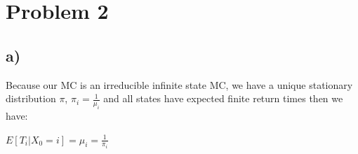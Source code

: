 \documentclass[]{article}
\begin{document}
\newpage

\hypertarget{problem-2}{%
\section{Problem 2}\label{problem-2}}

\hypertarget{a-1}{%
\subsection{a)}\label{a-1}}

Because our MC is an irreducible infinite state MC, we have a unique
stationary distribution \(\pi\), \(\pi_{i} = \frac{1}{\mu_{i}}\) and all
states have expected finite return times then we have:

\(E[T_{i}|X_{0} = i] = \mu_{i} = \frac{1}{\pi_{i}}\)
\end{document}
